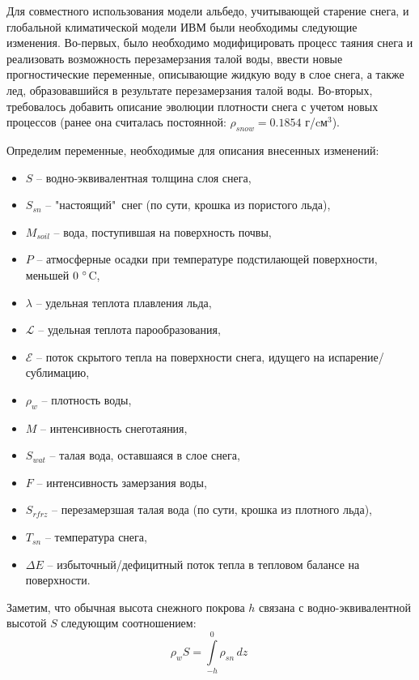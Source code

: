 \documentclass[a4paper, fontsize=14pt]{scrartcl}
\begin{document}
Для совместного использования модели альбедо, учитывающей старение снега, и глобальной климатической модели ИВМ были необходимы следующие изменения. Во-первых, было необходимо модифицировать процесс таяния снега и реализовать возможность перезамерзания талой воды, ввести новые прогностические переменные, описывающие жидкую воду в слое снега, а также лед, образовавшийся в результате перезамерзания талой воды. Во-вторых, требовалось добавить описание эволюции плотности снега с учетом новых процессов (ранее она считалась постоянной: $\rho_{snow} = 0.1854 $ г/cм$^3$).

Определим переменные, необходимые для описания внесенных изменений: 
\begin{itemize}
    \item $S$ -- водно-эквивалентная толщина слоя снега,
    \item $S_{sn}$ -- "настоящий"\  снег (по сути, крошка из пористого льда), 
    \item $M_{soil}$ -- вода, поступившая на поверхность почвы,
    \item $P$ -- атмосферные осадки при температуре подстилающей поверхности, меньшей $0 ~\degree$C,
    \item $\lambda$ -- удельная теплота плавления льда, 
    \item $\mathcal{L}$ -- удельная теплота парообразования, 
    \item $\mathcal{E}$ -- поток скрытого тепла на поверхности снега, идущего на испарение/сублимацию,
    \item $\rho_w$ -- плотность воды,
    \item $M$ -- интенсивность снеготаяния,
    \item $S_{wat}$ -- талая вода, оставшаяся в слое снега,
    \item $F$ -- интенсивность замерзания воды,
    \item $S_{rfrz}$ -- перезамерзшая талая вода (по сути, крошка из плотного льда),
    \item $T_{sn}$ -- температура снега, 
    \item $\Delta E$ -- избыточный/дефицитный поток тепла в тепловом балансе на поверхности.
\end{itemize}
Заметим, что обычная высота снежного покрова $h$ связана с водно-эквивалентной высотой $S$ следующим соотношением:
\begin{equation}
    \rho_w S =  \int\limits_{-h}^0 \rho_{sn} \, dz\  \label{sys}
\end{equation}
\end{document}
